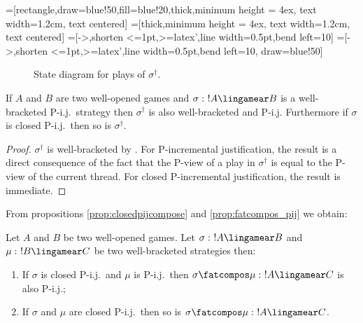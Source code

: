 =[rectangle,draw=blue!50,fill=blue!20,thick,minimum
height = 4ex, text width=1.2cm, text centered]
=[thick,minimum
height = 4ex, text width=1.2cm, text centered]
=[->,shorten <=1pt,>=latex',line width=0.5pt,bend left=10]
=[->,shorten <=1pt,>=latex',line width=0.5pt,bend left=10, draw=blue!50]
\begin{figure}[htbp]
\begin{center}
\end{center}
\caption{State diagram for plays of $\sigma^\dag$.}
\label{fig:promotion_state_diagram}
\end{figure}



\begin{proposition}
\label{prop:fatcompos_pij} If $A$ and $B$ are two well-opened games
and $\sigma :\ !A \lingamear B$ is a well-bracketed P-i.j.\ strategy
then $\sigma^\dag$ is also well-bracketed and P-i.j. Furthermore if
$\sigma$ is closed P-i.j.\ then so is $\sigma^\dagger$.
\end{proposition}
\begin{proof}
$\sigma^\dag$ is well-bracketed by \cite[Proposition
2.10.]{abramsky94full}. For P-incremental justification, the result is a direct consequence of the
fact that the P-view of a play in $\sigma^\dag$ is equal to the P-view of the current thread.
For closed P-incremental justification, the result is immediate.
\end{proof}

From propositions \ref{prop:closedpijcompose} and
\ref{prop:fatcompos_pij} we obtain:
\begin{corollary}
Let $A$ and $B$ be two well-opened games. Let $\sigma :\ !A
\lingamear B$ and $\mu :\ !B\lingamear C$ be two well-bracketed
strategies then:
\begin{enumerate}
\item If $\sigma$ is closed P-i.j.\ and $\mu$ is P-i.j.\ then $\sigma \fatcompos \mu :\ !A \lingamear
C$ is also P-i.j.;
\item If $\sigma$ and $\mu$ are closed P-i.j.\ then so is $\sigma \fatcompos \mu :\ !A \lingamear C$.
\end{enumerate}
\end{corollary}

